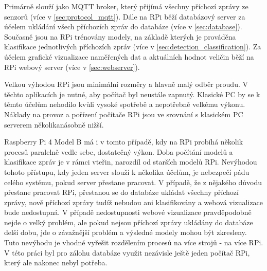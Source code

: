 Primárně slouží jako MQTT broker, který přijímá všechny příchozí zprávy ze senzorů (více v \cref{sec:protocol_mqtt}). Dále na RPi běží databázový server za účelem ukládání všech příchozích zpráv do databáze (více v \cref{sec:database}). Současně jsou na RPi trénovány modely, na základě kterých je prováděna klasifikace jednotlivých příchozích zpráv (více v \cref{sec:detection_classification}). Za účelem grafické vizualizace naměřených dat a aktuálních hodnot veličin běží na RPi webový server (více v \cref{sec:webserver}). 

Velkou výhodou RPi jsou minimální rozměry a hlavně malý odběr proudu. V těchto aplikacích je nutné, aby počítač byl neustále zapnutý. Klasické PC by se k těmto účelům nehodilo kvůli vysoké spotřebě a nepotřebně velkému výkonu. Náklady na provoz a pořízení počítače RPi jsou ve srovnání s klasickém PC serverem několikanásobně nižší. 

Raspberry Pi 4 Model B má i v tomto případě, kdy na RPi probíhá několik procesů paralelně vedle sebe, dostatečný výkon. Doba počítání modelů a klasifikace zpráv je v rámci vteřin, narozdíl od starších modelů RPi. Nevýhodou tohoto přístupu, kdy jeden server slouží k několika účelům, je nebezpečí pádu celého systému, pokud server přestane pracovat. V případě, že z nějakého důvodu přestane pracovat RPi, přestanou se do databáze ukládat všechny příchozí zprávy, nově příchozí zprávy tudíž nebudou ani klasifikovány a webová vizualizace bude nedostupná. V případě nedostupnosti webové vizualizace pravděpodobně nejde o velký problém, ale pokud nejsou příchozí zprávy ukládány do databáze delší dobu, jde o závažnější problém a výsledné modely mohou být zkresleny. Tuto nevýhodu je vhodné vyřešit rozdělením procesů na více strojů - na více RPi. V této práci byl pro zálohu databáze využit nezávisle ještě jeden počítač RPi, který ale nakonec nebyl potřeba.